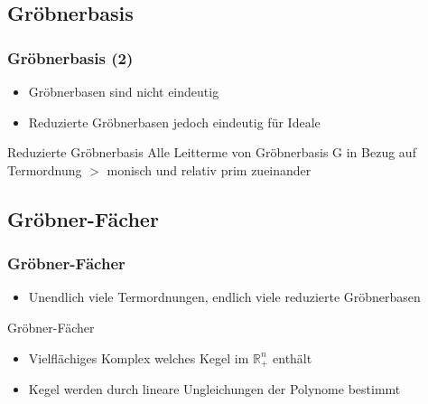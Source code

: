 \documentclass{beamer}
\begin{document}
\subsection{Gröbnerbasis}


\begin{frame}[<+->][fragile]
\frametitle{Gröbnerbasis (2)}

\begin{itemize}
\item Gröbnerbasen sind nicht eindeutig

\item Reduzierte Gröbnerbasen jedoch eindeutig für Ideale
\end{itemize}

\begin{block}{Reduzierte Gröbnerbasis}
Alle Leitterme von Gröbnerbasis G in Bezug auf Termordnung $>$ monisch und relativ prim zueinander 
\end{block}




\end{frame}







\subsection{Gröbner-Fächer}


\begin{frame}[<+->][fragile]
\frametitle{Gröbner-Fächer}
\begin{itemize}
\item Unendlich viele Termordnungen, endlich viele reduzierte Gröbnerbasen

\end{itemize}

\begin{block}{Gröbner-Fächer}
\begin{itemize}
\item Vielflächiges Komplex welches Kegel im $\mathbb{R}^{n}_{+}$ enthält
\item Kegel werden durch lineare Ungleichungen der Polynome bestimmt 
\end{itemize}

\end{block}

\end{frame}
\end{document}
